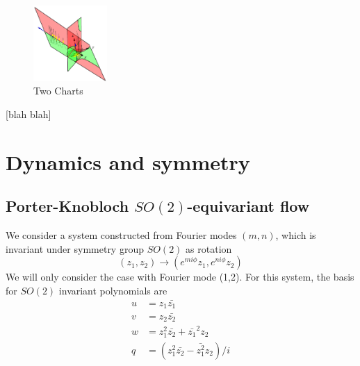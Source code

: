 \documentclass{article}
\begin{document}
\begin{figure}
\centering
\includegraphics[width=0.25\textwidth]{RoessSctAtlas3.png}
\caption{Two Charts}
\label{fig:RoessSctAtlas3}
\end{figure}

 [blah blah]

\section{Dynamics and symmetry}
\label{s:symm}

\subsection{Porter-Knobloch $SO(2)$-equivariant flow}
\label{s:twoMode}

We consider a system constructed from Fourier modes
$(m,n)$\cite{Dang86,AGHO288,PoKno05}, which is invariant under symmetry
group $SO(2)$ as rotation
\begin{equation}
(z_1,z_2)\to(e^{mi\phi}z_1,e^{ni\phi}z_2)\label{Dang86(1.1)aa}
\end{equation}
We will only consider the case with Fourier mode (1,2). For this system,
the basis for $SO(2)$ invariant polynomials are
\begin{align}
u&=z_1\bar{z_1}\\
v&=z_2\bar{z_2}\\
w&=z_1^2\bar{z_2}+\bar{z_1}^2z_2\\
q&=(z_1^2\bar{z_2}-\bar{z_1^2}z_2)/i\\
\label{Dang86(1.2)PK}
\end{align}
\end{document}
